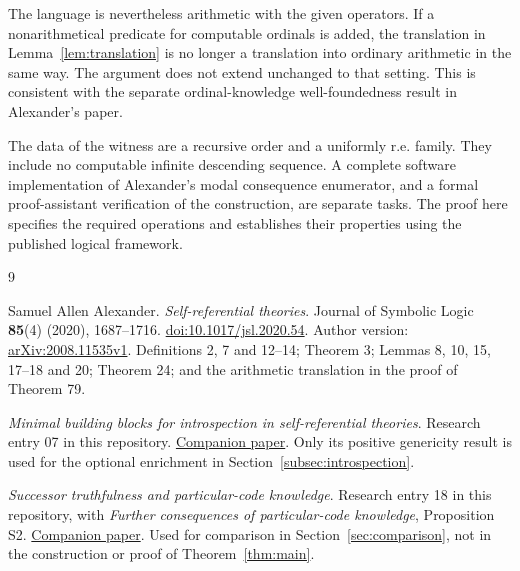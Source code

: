 \documentclass[11pt]{article}
\theoremstyle{definition}
\begin{document}
The language is nevertheless arithmetic with the given operators. If a
nonarithmetical predicate for computable ordinals is added, the translation
in Lemma~\ref{lem:translation} is no longer a translation into ordinary
arithmetic in the same way. The argument does not extend unchanged to
that setting. This is consistent with the separate ordinal-knowledge
well-foundedness result in Alexander's paper.

The data of the witness are a recursive order and a uniformly r.e. family.
They include no computable infinite descending sequence. A complete software
implementation of Alexander's modal consequence enumerator, and a formal
proof-assistant verification of the construction, are separate tasks. The
proof here specifies the required operations and establishes their
properties using the published logical framework.

\begin{thebibliography}{9}

Samuel Allen Alexander.
\emph{Self-referential theories}.
Journal of Symbolic Logic \textbf{85}(4) (2020), 1687--1716.
\href{https://doi.org/10.1017/jsl.2020.54}{doi:10.1017/jsl.2020.54}.
Author version:
\href{https://arxiv.org/abs/2008.11535v1}{arXiv:2008.11535v1}.
Definitions 2, 7 and 12--14; Theorem 3; Lemmas 8, 10, 15, 17--18 and 20;
Theorem 24; and the arithmetic translation in the proof of Theorem 79.

\emph{Minimal building blocks for introspection in self-referential theories}.
Research entry 07 in this repository.
\href{../07-minimal-introspection-bundle/minimal-introspection-bundle.pdf}
{Companion paper}.
Only its positive genericity result is used for the optional enrichment in
Section~\ref{subsec:introspection}.

\emph{Successor truthfulness and particular-code knowledge}.
Research entry 18 in this repository, with
\emph{Further consequences of particular-code knowledge}, Proposition S2.
\href{../18-dissertation-problem-3-2-1/successor-knowers-3-2-1.pdf}
{Companion paper}.
Used for comparison in Section~\ref{sec:comparison}, not in the construction
or proof of Theorem~\ref{thm:main}.

\end{thebibliography}
\end{document}
